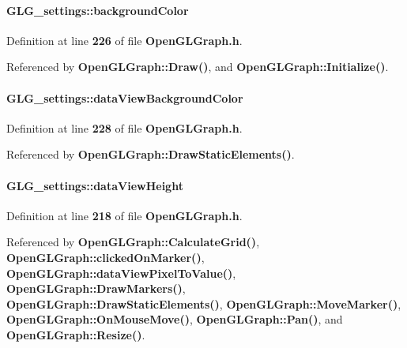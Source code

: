 \paragraph[{background\+Color}]{ G\+L\+G\+\_\+settings\+::background\+Color}\label{structGLG__settings_ad14e8df0525eb65451ad890e9ea79593}


Definition at line {\bf 226} of file {\bf Open\+G\+L\+Graph.\+h}.



Referenced by {\bf Open\+G\+L\+Graph\+::\+Draw()}, and {\bf Open\+G\+L\+Graph\+::\+Initialize()}.

\paragraph[{data\+View\+Background\+Color}]{ G\+L\+G\+\_\+settings\+::data\+View\+Background\+Color}\label{structGLG__settings_a61a55cdbccd0359881ee6ea5df72d74b}


Definition at line {\bf 228} of file {\bf Open\+G\+L\+Graph.\+h}.



Referenced by {\bf Open\+G\+L\+Graph\+::\+Draw\+Static\+Elements()}.

\paragraph[{data\+View\+Height}]{ G\+L\+G\+\_\+settings\+::data\+View\+Height}\label{structGLG__settings_a3ba95c61e5f939cbcacc5f1aed6ddf25}


Definition at line {\bf 218} of file {\bf Open\+G\+L\+Graph.\+h}.



Referenced by {\bf Open\+G\+L\+Graph\+::\+Calculate\+Grid()}, {\bf Open\+G\+L\+Graph\+::clicked\+On\+Marker()}, {\bf Open\+G\+L\+Graph\+::data\+View\+Pixel\+To\+Value()}, {\bf Open\+G\+L\+Graph\+::\+Draw\+Markers()}, {\bf Open\+G\+L\+Graph\+::\+Draw\+Static\+Elements()}, {\bf Open\+G\+L\+Graph\+::\+Move\+Marker()}, {\bf Open\+G\+L\+Graph\+::\+On\+Mouse\+Move()}, {\bf Open\+G\+L\+Graph\+::\+Pan()}, and {\bf Open\+G\+L\+Graph\+::\+Resize()}.

